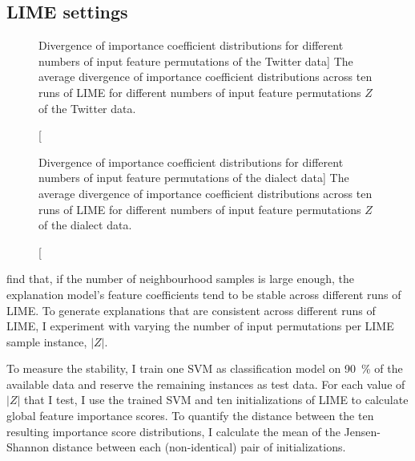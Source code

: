 \subsection{LIME settings}

\begin{figure}[ht]
    \centering
    
    \caption
    [Divergence of importance coefficient distributions for different numbers of input feature permutations of the Twitter data]
    {The average divergence of importance coefficient distributions across ten runs of LIME for different numbers of input feature permutations $Z$ of the Twitter data.}
    \label{fig:tweets-z}
\end{figure}
\begin{figure}[ht]
    \centering
    
    \caption
    [Divergence of importance coefficient distributions for different numbers of input feature permutations of the dialect data]
    {The average divergence of importance coefficient distributions across ten runs of LIME for different numbers of input feature permutations $Z$ of the dialect data.}
    \label{fig:dialects-z}
\end{figure}

\citeauthor{garreau2020explaining} find that, if the number of neighbourhood samples is large enough, the explanation model's feature coefficients tend to be stable across different runs of LIME. %
To generate explanations that are consistent across different runs of LIME, I experiment with varying the number of input permutations per LIME sample instance, $|Z|$.

To measure the stability, I train one SVM as classification model on 90~\% of the available data and reserve the remaining instances as test data.
For each value of $|Z|$ that I test, I use the trained SVM and ten initializations of LIME to calculate global feature importance scores.
To quantify the distance between the ten resulting importance score distributions, I calculate the mean of the Jensen-Shannon distance \citep{lin1991divergence} between each (non-identical) pair of initializations.



